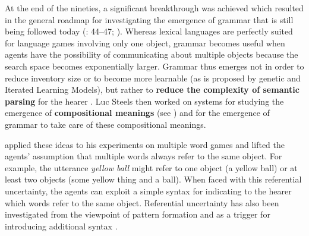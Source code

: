 At the end of the nineties, a significant breakthrough was achieved which resulted in the general roadmap for investigating the emergence of grammar that is still being followed today (\citealp{steels99talking-heads}: 44--47; \citealp{steels00emergence}). Whereas lexical languages are perfectly suited for language games involving only one object, grammar becomes useful when agents have the possibility of communicating about multiple objects because the search space becomes exponentially larger. Grammar thus emerges not in order to reduce inventory size or to become more learnable (as is proposed by genetic and Iterated Learning Models), but rather to {\bfseries reduce the complexity of semantic parsing} for the hearer \citep[this idea has been formalized and operationalized by][]{steels05what}. Luc Steels then worked on systems for studying the emergence of {\bfseries compositional meanings} (see ) and for the emergence of grammar to take care of these compositional meanings.

\citet{vanlooveren05design} applied these ideas to his experiments on multiple word games and lifted the agents' assumption that multiple words always refer to the same object. For example, the utterance {\em yellow ball} might refer to one object (a yellow ball) or at least two objects (some yellow thing and a ball). When faced with this referential uncertainty, the agents can exploit a simple syntax for indicating to the hearer which words refer to the same object. Referential uncertainty has also been investigated from the viewpoint of pattern formation \citep[as another pregrammatical stage,][]{steels07multilevel} and as a trigger for introducing additional syntax \citep{steels06how-grammar}.

